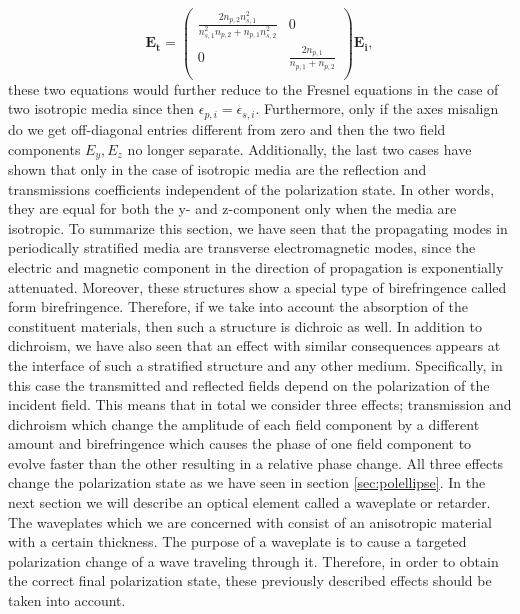 \begin{equation}
    \bm{E_t} =
    \begin{pmatrix}
        \frac{2n_{p,2}n_{s,1}^2}{n_{s,1}^2n_{p,2}+n_{p,1}n_{s,2}^2} & 0 \\
        0 & \frac{2n_{p,1}}{n_{p,1}+n_{p,2}} \\
    \end{pmatrix}
    \bm{E_i},
\end{equation}
these two equations would further reduce to the Fresnel equations in the case of two isotropic media since then $\epsilon_{p,i}=\epsilon_{s,i}$. Furthermore, only if the axes misalign do we get off-diagonal entries different from zero and then the two field components $E_y, E_z$ no longer separate. Additionally, the last two cases have shown that only in the case of isotropic media are the reflection and transmissions coefficients independent of the polarization state. In other words, they are equal for both the y- and z-component only when the media are isotropic. To summarize this section, we have seen that the propagating modes in periodically stratified media are transverse electromagnetic modes, since the electric and magnetic component in the direction of propagation is exponentially attenuated. Moreover, these structures show a special type of birefringence called form birefringence. Therefore, if we take into account the absorption of the constituent materials, then such a structure is dichroic as well. In addition to dichroism, we have also seen that an effect with similar consequences appears at the interface of such a stratified structure and any other medium. Specifically, in this case the transmitted and reflected fields depend on the polarization of the incident field. This means that in total we consider three effects; transmission and dichroism which change the amplitude of each field component by a different amount and birefringence which causes the phase of one field component to evolve faster than the other resulting in a relative phase change. All three effects change the polarization state as we have seen in section \ref{sec:polellipse}. In the next section we will describe an optical element called a waveplate or retarder. The waveplates which we are concerned with consist of an anisotropic material with a certain thickness. The purpose of a waveplate is to cause a targeted polarization change of a wave traveling through it. Therefore, in order to obtain the correct final polarization state, these previously described effects should be taken into account. 

